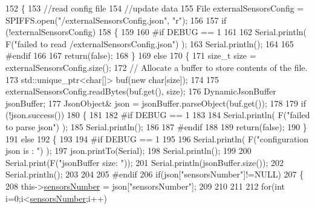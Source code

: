 \begin{DoxyCode}
152 \{
153     \textcolor{comment}{//read config file}
154     \textcolor{comment}{//update data}
155     File externalSensorsConfig = SPIFFS.open(\textcolor{stringliteral}{"/externalSensorsConfig.json"}, \textcolor{stringliteral}{"r"});
156 
157     \textcolor{keywordflow}{if} (!externalSensorsConfig) 
158     \{
159     
160 \textcolor{preprocessor}{    #if DEBUG == 1}
161         
162         Serial.println( F(\textcolor{stringliteral}{"failed to read /externalSensorsConfig.json"}) );
163         Serial.println();
164     
165 \textcolor{preprocessor}{    #endif}
166         
167         \textcolor{keywordflow}{return}(\textcolor{keyword}{false});
168     \}
169     \textcolor{keywordflow}{else}
170     \{
171         \textcolor{keywordtype}{size\_t} size = externalSensorsConfig.size();
172         \textcolor{comment}{// Allocate a buffer to store contents of the file.}
173         std::unique\_ptr<char[]> buf(\textcolor{keyword}{new} \textcolor{keywordtype}{char}[size]);
174 
175         externalSensorsConfig.readBytes(buf.get(), size);
176         DynamicJsonBuffer jsonBuffer;
177         JsonObject& json = jsonBuffer.parseObject(buf.get());
178 
179         \textcolor{keywordflow}{if} (!json.success()) 
180         \{
181         
182 \textcolor{preprocessor}{        #if DEBUG == 1 }
183 
184             Serial.println( F(\textcolor{stringliteral}{"failed to parse json"}) );
185             Serial.println();
186         
187 \textcolor{preprocessor}{        #endif}
188 
189             \textcolor{keywordflow}{return}(\textcolor{keyword}{false});
190         \} 
191         \textcolor{keywordflow}{else}
192         \{
193         
194 \textcolor{preprocessor}{        #if DEBUG == 1 }
195     
196             Serial.println( F(\textcolor{stringliteral}{"configuration json is : "}) );
197             json.printTo(Serial);
198             Serial.println();
199 
200             Serial.print(F(\textcolor{stringliteral}{"jsonBuffer size: "}));
201             Serial.println(jsonBuffer.size());
202             Serial.println();
203 
204         
205 \textcolor{preprocessor}{        #endif          }
206             \textcolor{keywordflow}{if}(json[\textcolor{stringliteral}{"sensorsNumber"}]!=NULL)
207             \{
208                 this->\hyperlink{class_external_sensors_a58e4fbf9adeae787d92be5fa33043b5d}{sensorsNumber} = json[\textcolor{stringliteral}{"sensorsNumber"}];
209                 
210                 
211 
212                 \textcolor{keywordflow}{for}(\textcolor{keywordtype}{int} i=0;i<\hyperlink{class_external_sensors_a58e4fbf9adeae787d92be5fa33043b5d}{sensorsNumber};i++)

\end{DoxyCode}
